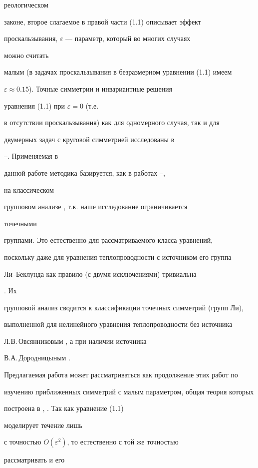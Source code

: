 реологическом


законе, второе слагаемое в правой части (1.1) описывает эффект


проскальзывания, $\varepsilon$ --- параметр, который во многих случаях


можно считать


малым (в задачах проскальзывания в безразмерном уравнении (1.1) имеем


$\varepsilon\approx 0.15$). Точные симметрии и инвариантные решения


уравнения (1.1) при $\varepsilon=0$ (т.е.


в отсутствии проскальзывания) как для одномерного случая, так и для


двумерных задач с круговой симметрией исследованы в


\cite{Sal}--\cite{Ch2}. Применяемая в


данной работе методика базируется, как в работах \cite{Sal}--\cite{Ch2},


на классическом


групповом анализе \cite{Ovs1}, т.к. наше исследование ограничивается


точечными


группами. Это естественно для рассматриваемого класса уравнений,


поскольку даже для уравнения теплопроводности с источником его группа


Ли--Беклунда \cite{Ibr} как правило (с двумя исключениями) тривиальна


\cite{Dor1}. Их


групповой анализ сводится к классификации точечных симметрий (групп Ли),


выполненной для нелинейного уравнения теплопроводности без источника


Л.В.\,Овсянниковым \cite{Ovs2}, а при наличии источника


В.А.\,Дородницыным \cite{Dor2}.


Предлагаемая работа может рассматриваться как продолжение этих работ по


изучению приближенных симметрий с малым параметром, общая теория которых


построена в \cite{Bai1}, \cite{Bai2}. Так как уравнение (1.1)


моделирует течение лишь


с точностью $O(\varepsilon^2)$, то естественно с той же точностью


рассматривать и его



